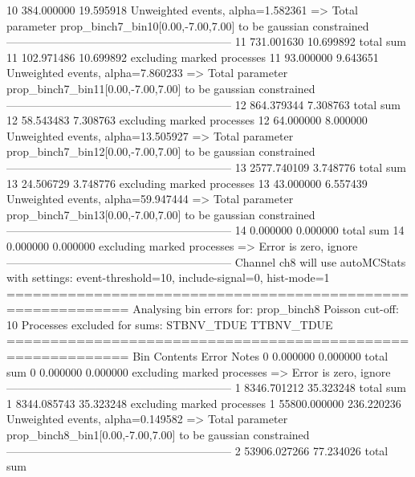 10         384.000000      19.595918       Unweighted events, alpha=1.582361
  => Total parameter prop_binch7_bin10[0.00,-7.00,7.00] to be gaussian constrained
------------------------------------------------------------
11         731.001630      10.699892       total sum                     
11         102.971486      10.699892       excluding marked processes    
11         93.000000       9.643651        Unweighted events, alpha=7.860233
  => Total parameter prop_binch7_bin11[0.00,-7.00,7.00] to be gaussian constrained
------------------------------------------------------------
12         864.379344      7.308763        total sum                     
12         58.543483       7.308763        excluding marked processes    
12         64.000000       8.000000        Unweighted events, alpha=13.505927
  => Total parameter prop_binch7_bin12[0.00,-7.00,7.00] to be gaussian constrained
------------------------------------------------------------
13         2577.740109     3.748776        total sum                     
13         24.506729       3.748776        excluding marked processes    
13         43.000000       6.557439        Unweighted events, alpha=59.947444
  => Total parameter prop_binch7_bin13[0.00,-7.00,7.00] to be gaussian constrained
------------------------------------------------------------
14         0.000000        0.000000        total sum                     
14         0.000000        0.000000        excluding marked processes    
  => Error is zero, ignore      
------------------------------------------------------------
Channel ch8 will use autoMCStats with settings: event-threshold=10, include-signal=0, hist-mode=1
============================================================
Analysing bin errors for: prop_binch8
Poisson cut-off: 10
Processes excluded for sums: STBNV_TDUE TTBNV_TDUE
============================================================
Bin        Contents        Error           Notes                         
0          0.000000        0.000000        total sum                     
0          0.000000        0.000000        excluding marked processes    
  => Error is zero, ignore      
------------------------------------------------------------
1          8346.701212     35.323248       total sum                     
1          8344.085743     35.323248       excluding marked processes    
1          55800.000000    236.220236      Unweighted events, alpha=0.149582
  => Total parameter prop_binch8_bin1[0.00,-7.00,7.00] to be gaussian constrained
------------------------------------------------------------
2          53906.027266    77.234026       total sum                     
